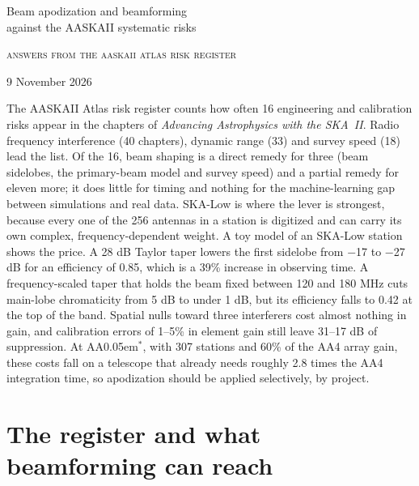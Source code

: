 \documentclass[11pt,a4paper]{article}
\newcommand{\AAstar}{AA\kern0.05em$^{*}$}
\begin{document}
\begin{center}
{\fontsize{19}{23}\selectfont Beam apodization and beamforming\\[2pt] against the AASKAII systematic risks}\par\vspace{8pt}
{\scshape answers from the aaskaii atlas risk register}\par\vspace{4pt}
{\small\textcolor{quiet}{9 November 2026}}
\end{center}
\vspace{6pt}
\begin{center}\begin{minipage}{0.9\textwidth}\small
The AASKAII Atlas risk register counts how often 16 engineering and calibration risks appear in the chapters of \emph{Advancing Astrophysics with the SKA~II}. Radio frequency interference (40 chapters), dynamic range (33) and survey speed (18) lead the list. Of the 16, beam shaping is a direct remedy for three (beam sidelobes, the primary-beam model and survey speed) and a partial remedy for eleven more; it does little for timing and nothing for the machine-learning gap between simulations and real data. SKA-Low is where the lever is strongest, because every one of the 256 antennas in a station is digitized and can carry its own complex, frequency-dependent weight. A toy model of an SKA-Low station shows the price. A 28 dB Taylor taper lowers the first sidelobe from −17 to −27 dB for an efficiency of 0.85, which is a 39\% increase in observing time. A frequency-scaled taper that holds the beam fixed between 120 and 180 MHz cuts main-lobe chromaticity from 5 dB to under 1 dB, but its efficiency falls to 0.42 at the top of the band. Spatial nulls toward three interferers cost almost nothing in gain, and calibration errors of 1--5\% in element gain still leave 31--17 dB of suppression. At \AAstar, with 307 stations and 60\% of the AA4 array gain, these costs fall on a telescope that already needs roughly 2.8 times the AA4 integration time, so apodization should be applied selectively, by project.
\end{minipage}\end{center}
\vspace{4pt}

\section{The register and what beamforming can reach}
\end{document}
